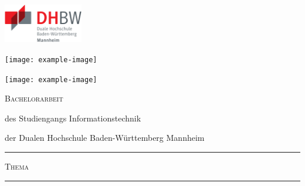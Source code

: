 \begin{titlepage}
    \begin{minipage}[c]{.30\textwidth}
        \includegraphics[height=1.7cm]{dhbw-logo}
    \end{minipage}
    \hfill
    \begin{minipage}[c]{.30\textwidth}
        \centering
        \texttt{[image: example-image]}
    \end{minipage}
    \hfill
    \begin{minipage}[c]{.30\textwidth}
        \raggedleft
        \texttt{[image: example-image]}
    \end{minipage}
    
    \begin{center}
    \Large\textsc{Bachelorarbeit}
    
    \normalsize
    des Studiengangs Informationstechnik\par
    der Dualen Hochschule Baden-Württemberg Mannheim
    \end{center}
    
    \rule{\textwidth}{.5mm}\bigskip
    
    \centering\textsc{\large Thema }
    
    {\bfseries \getThesisTitle}\bigskip
    
    
    \rule{\textwidth}{.5mm}
    
    \vfill
    

\end{titlepage}

